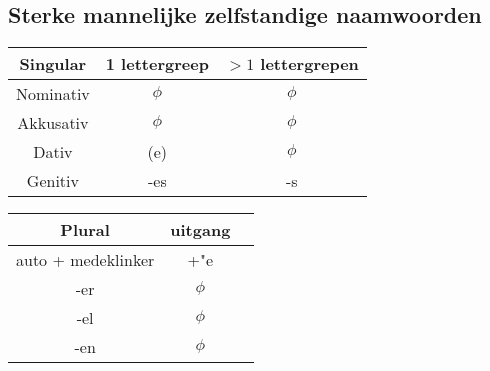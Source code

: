 \documentclass[main.tex]{subfiles}
\begin{document}
\subsection{Sterke mannelijke zelfstandige naamwoorden}
\begin{minipage}[t]{0.5\textwidth}
\begin{tabular}{|c|c|c|}
\hline 
\rowcolor{gray}
Singular & 1 lettergreep & $>1$ lettergrepen \\ 
\hline 
\cellcolor[gray]{0.8}Nominativ & $\phi$ & $\phi$\\ 
\hline 
\cellcolor[gray]{0.8}Akkusativ & $\phi$ & $\phi$\\ 
\hline 
\cellcolor[gray]{0.8}Dativ & (e) & $\phi$ \\ 
\hline 
\cellcolor[gray]{0.8}Genitiv & -es & -s \\ 
\hline 
\end{tabular} 
\end{minipage}
\begin{minipage}[t]{0.5\textwidth}
\begin{tabular}{|c|c|c|}
\hline 
\rowcolor{gray}
Plural & uitgang \\ 
\hline 
\cellcolor[gray]{0.8}auto + medeklinker & +"e \\ 
\hline 
\cellcolor[gray]{0.8} -er & $\phi$ \\ 
\hline 
\cellcolor[gray]{0.8} -el & $\phi$ \\ 
\hline 
\cellcolor[gray]{0.8} -en & $\phi$ \\ 
\hline 
\end{tabular} 
\end{minipage}
\end{document}
